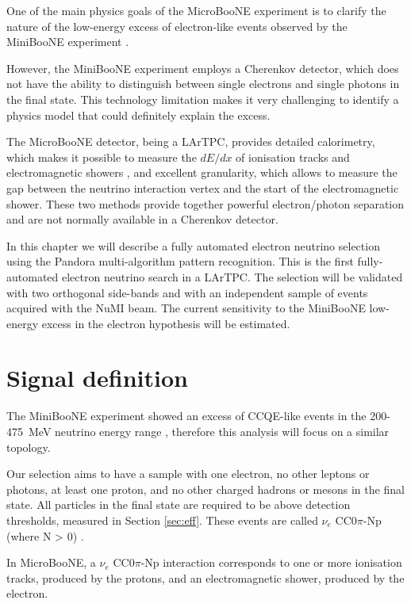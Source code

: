 One of the main physics goals of the MicroBooNE experiment is to clarify the nature of the low-energy excess of electron-like events observed by the MiniBooNE experiment \cite{Aguilar-Arevalo:2018gpe}. 

However, the MiniBooNE experiment employs a Cherenkov detector, which does not have the ability to distinguish between single electrons and single photons in the final state. This technology limitation makes it very challenging to identify a physics model that could definitely explain the excess.

The MicroBooNE detector, being a LArTPC, provides detailed  calorimetry, which makes it possible to measure the $dE/dx$ of ionisation tracks and electromagnetic showers \cite{Acciarri:2016sli}, and excellent granularity, which allows to measure the gap between the neutrino interaction vertex and the start of the electromagnetic shower. These two methods provide together powerful electron/photon separation and are not normally available in a Cherenkov detector. 

In this chapter we will describe a fully automated electron neutrino selection using the Pandora multi-algorithm pattern recognition. This is the first fully-automated electron neutrino search in a LArTPC. The selection will be validated with two orthogonal side-bands and with an independent sample of events acquired with the NuMI beam. The current sensitivity to the MiniBooNE low-energy excess in the electron hypothesis will be estimated.

\section{Signal definition}
The MiniBooNE experiment showed an excess of CCQE-like events in the 200-475~MeV neutrino energy range \cite{Aguilar-Arevalo:2018gpe}, therefore this analysis will focus on a similar topology.

Our selection aims to have a sample with one electron, no other leptons or photons, at least one proton, and no other charged hadrons or mesons in the final state. All particles in the final state are required to be above detection thresholds, measured in Section \ref{sec:eff}. These events are called $\nu_{e}$ CC0$\pi$-Np (where N > 0) \cite{Katori:2013nca}. 

In MicroBooNE, a $\nu_{e}$ CC0$\pi$-Np interaction corresponds to one or more ionisation tracks, produced by the protons, and an electromagnetic shower, produced by the electron. 


